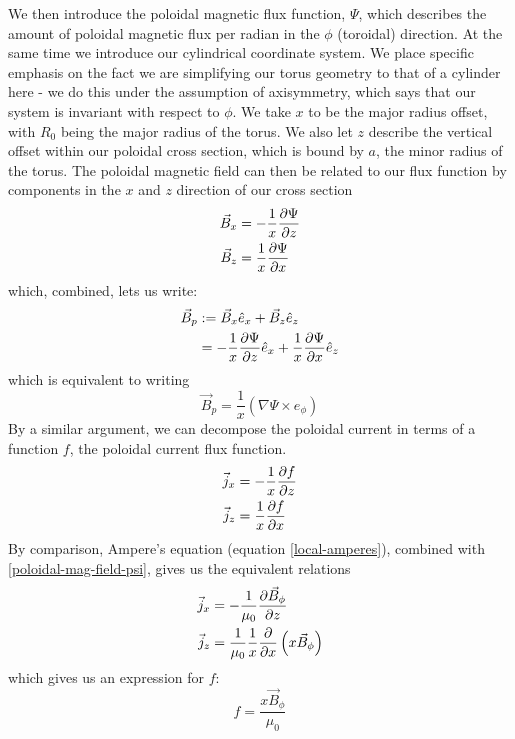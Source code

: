 We then introduce the poloidal magnetic flux function, $\Psi$, which describes the amount of poloidal magnetic flux 
per radian in the $\phi$ (toroidal) direction. At the same time we introduce our cylindrical coordinate system. 
We place specific emphasis on the fact we are simplifying our torus geometry to that of a cylinder here - we do this 
under the assumption of axisymmetry, which says that our system is invariant with respect to $\phi$. We take $x$ to be the 
major radius offset, with $R_0$ being the major radius of the torus. We also let $z$ describe the vertical offset within our poloidal 
cross section, which is bound by $a$, the minor radius of the torus. The poloidal magnetic field can then be related 
to our flux function by components in the $x$ and $z$ direction of our cross section
\begin{align}
    \vec{B}_x &= -\frac{1}{x} \pdv{\Psi}{z} \\
    \vec{B}_z &= \frac{1}{x} \pdv{\Psi}{x}
\end{align}
which, combined, lets us write:
\begin{align}
    \vec{B}_p &:= \vec{B}_x \hat{e}_x + \vec{B}_z \hat{e}_z \\
    &= -\frac{1}{x} \pdv{\Psi}{z} \hat{e}_x + \frac{1}{x} \pdv{\Psi}{x} \hat{e}_z
\end{align}
which is equivalent to writing 
\begin{equation}
    \label{poloidal-mag-field-psi} \vec{B}_p = \frac{1}{x} \left ( \nabla \Psi \times e_{\phi} \right )
\end{equation}
By a similar argument, we can decompose the poloidal current in terms of a function $f$, the poloidal current 
flux function.
\begin{align}
    \label{current-1} \vec{j}_{x} &= -\frac{1}{x} \pdv{f}{z} \\
    \label{current-2} \vec{j}_{z} &= \frac{1}{x} \pdv{f}{x}
\end{align}
By comparison, Ampere's equation (equation \ref{local-amperes}), combined with \ref{poloidal-mag-field-psi}, gives us the equivalent relations
\begin{align}
    \vec{j}_{x} &= -\frac{1}{\mu_0} \pdv{\vec{B}_{\phi}}{z} \\
    \vec{j}_{z} &= \frac{1}{\mu_0}\frac{1}{x} \pdv{}{x} \left ( x \vec{B}_{\phi} \right )
\end{align}
which gives us an expression for $f$:
\begin{equation}
    f = \frac{x \vec{B}_{\phi}}{\mu_0}
\end{equation}
